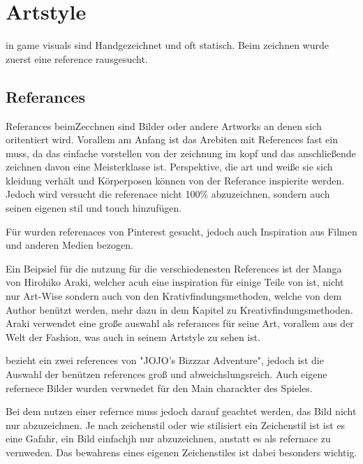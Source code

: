 
\section{Artstyle}\label{sec:artstyle}

\renewcommand{\kapitelautor}{Autor: Philip Jankovic}

\FF in game visuals sind Handgezeichnet und oft statisch. Beim zeichnen wurde zuerst eine reference rausgesucht.


\subsection{Referances}\label{subsec:references}
Referances beimZecchnen sind Bilder oder andere Artworks an denen sich oritentiert wird. Vorallem am Anfang ist das
Arebiten mit References fast ein muss, da das einfache vorstellen von der zeichnung im kopf und das anschließende zeichnen davon eine Meisterklasse ist.
Perspektive, die art und weiße sie sich kleidung verhält und Körperposen können von der Referance inspierite werden.
Jedoch wird versucht die referenace nicht 100\% abzuzeichnen, sondern auch seinen eigenen stil und touch hinzufügen. 


Für \FF wurden referenaces von Pinterest gesucht, jedoch auch Inspiration aus Filmen und anderen Medien bezogen.


Ein Beipsiel für die nutzung für die verschiedenesten References ist der Manga  von Hirohiko Araki,
welcher acuh eine inspiration für einige Teile von \FF ist, nicht nur Art-Wise sondern auch von den Krativfindungsmethoden, welche von dem Author benützt werden, mehr dazu in dem
Kapitel zu Kreativfindungsmethoden. %
Araki verwendet eine große auswahl als referances für seine Art, vorallem aus der Welt
der Fashion, was auch in seinem Artstyle zu sehen ist.


\FF bezieht ein zwei references von "JOJO's Bizzzar Adventure", jedoch ist die Auswahl der benützen references groß und abweichslungsreich.
Auch eigene refernece Bilder wurden verwnedet für den Main charackter des Spieles.


Bei dem nutzen einer refernce muss jedoch darauf geachtet werden, das Bild nicht nur abzuzeichnen. Je nach zeichenstil
oder wie stilisiert ein Zeichenstil ist ist es eine Gafahr, ein  Bild einfachjh nur abzuzeichnen, anstatt es als refernace zu vernweden.
Das bewahrens eines eigenen Zeichenstiles ist dabei besonders wichtig.


